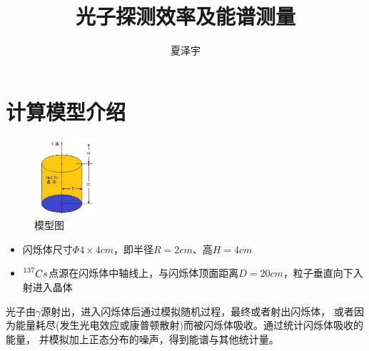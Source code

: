 \documentclass[UTF8, a4paper]{ctexart}
\title{光子探测效率及能谱测量}
\author{夏泽宇}
\begin{document}
\maketitle
\section{计算模型介绍}
\begin{figure}[h]
    \centering
    \includegraphics[width=0.2\textwidth]{../fig/model.png}
    \caption{模型图}
    \label{fig:model}
\end{figure}
\begin{itemize}
    \item 闪烁体尺寸$\Phi4\times4 cm$，即半径$R=2cm$、高$H=4cm$
    \item $\prescript{137}{}{Cs}$点源在闪烁体中轴线上，与闪烁体顶面距离$D=20cm$，粒子垂直向下入射进入晶体
\end{itemize}

光子由$\gamma$源射出，进入闪烁体后通过模拟随机过程，最终或者射出闪烁体，
或者因为能量耗尽(发生光电效应或康普顿散射)而被闪烁体吸收。通过统计闪烁体吸收的能量，
并模拟加上正态分布的噪声，得到能谱与其他统计量。
\end{document}
